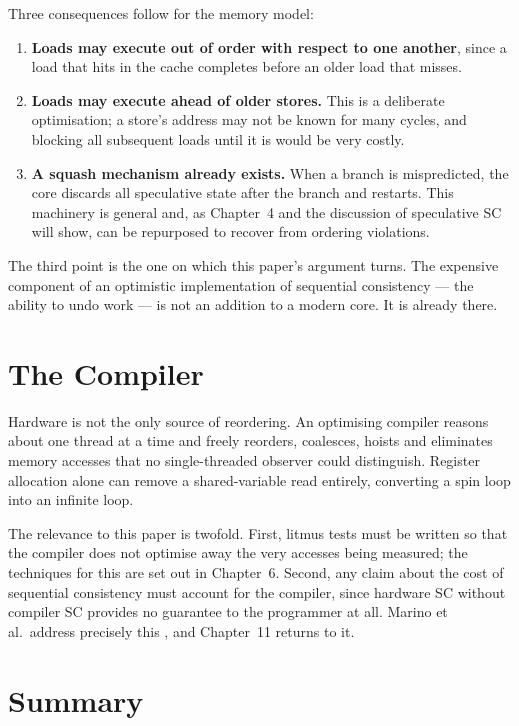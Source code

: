 Three consequences follow for the memory model:

\begin{enumerate}
\item \textbf{Loads may execute out of order with respect to one another}, since a
  load that hits in the cache completes before an older load that misses.
\item \textbf{Loads may execute ahead of older stores.} This is a deliberate
  optimisation; a store's address may not be known for many cycles, and blocking
  all subsequent loads until it is would be very costly.
\item \textbf{A squash mechanism already exists.} When a branch is mispredicted,
  the core discards all speculative state after the branch and restarts.
This
  machinery is general and, as Chapter~4 and the discussion of speculative SC will
  show, can be repurposed to recover from ordering violations.
\end{enumerate}

The third point is the one on which this paper's argument turns.
The expensive
component of an optimistic implementation of sequential consistency --- the
ability to undo work --- is not an addition to a modern core.
It is already there.

\section{The Compiler}
\label{sec:compiler}

Hardware is not the only source of reordering.
An optimising compiler reasons
about one thread at a time and freely reorders, coalesces, hoists and eliminates
memory accesses that no single-threaded observer could distinguish.
Register
allocation alone can remove a shared-variable read entirely, converting a spin
loop into an infinite loop.

The relevance to this paper is twofold.
First, litmus tests must be written so
that the compiler does not optimise away the very accesses being measured; the
techniques for this are set out in Chapter~6.
Second, any claim about the cost of
sequential consistency must account for the compiler, since hardware SC without
compiler SC provides no guarantee to the programmer at all.
Marino et al.\ address
precisely this \cite{marino2011sc}, and Chapter~11 returns to it.

\section{Summary}
\label{sec:bg-summary}

